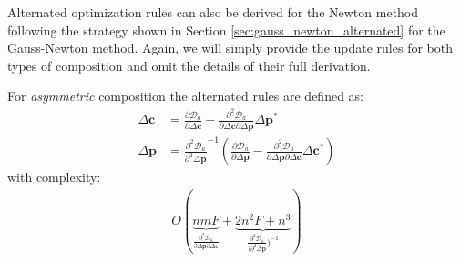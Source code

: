 Alternated optimization rules can also be derived for the Newton method following the strategy shown in Section \ref{sec:gauss_newton_alternated} for the Gauss-Newton method. Again, we will simply provide the update rules for both types of composition and omit the details of their full derivation.

For \emph{asymmetric} composition the alternated rules are defined as:
\begin{equation}
    \begin{aligned}
        \Delta \mathbf{c} & = \frac{\partial \mathcal{D}_a}{\partial \Delta \mathbf{c}} - \frac{\partial^2 \mathcal{D}_a}{\partial \Delta \mathbf{c} \partial \Delta \mathbf{p}} \Delta \mathbf{p}^*
        \\
        \Delta \mathbf{p} & = \frac{\partial^2 \mathcal{D}_a}{\partial^2 \Delta \mathbf{p}}^{-1} \left( \frac{\partial \mathcal{D}_a}{\partial \Delta \mathbf{p}} - \frac{\partial^2 \mathcal{D}_a}{\partial \Delta \mathbf{p} \partial \Delta \mathbf{c}} \Delta \mathbf{c}^* \right)
        \label{eq:asymmetric_newton_alternated_solution}
    \end{aligned}
\end{equation}
with complexity:
\begin{equation}
    \begin{aligned}
        O(
        \underbrace{nmF}_{\frac{\partial^2 \mathcal{D}_a}{\partial \Delta \mathbf{p} \partial \Delta \mathbf{c}}}
        +
        \underbrace{2n^2F + n^3}_{\frac{\partial^2 \mathcal{D}_a}{(\partial^2 \Delta \mathbf{p}})^{-1}}
        )
    \label{eq:complexity_alt_asymmetric_newton}
    \end{aligned}
\end{equation}

